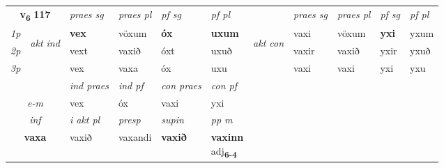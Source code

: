 \noindent
\begin{tabular}{lllllllllll} \toprule
\multicolumn{2}{c}{\textbf{v{\textsubscript{6}}} \Large{\textbf{117}}}  &  \textit{praes sg}  & \textit{praes pl}  &\textit{ pf sg} & \textit{pf pl} &  &  \textit{praes sg}  & \textit{praes pl}  & \textit{pf sg} & \textit{pf pl } \\*
	\cmidrule{3-6} \cmidrule{8-11}
 {\textit{1p}} & \multirow{3}{*}{\begin{turn}{90}\textit{akt ind}\end{turn}} & \textbf{vex} & vöxum & \textbf{óx} & \textbf{uxum} & \multirow{3}{*}{\begin{turn}{90}\textit{akt con}\end{turn}} &vaxi & vöxum & \textbf{yxi} & yxum\\*
 {\textit{2p}} &  &  vext  & vaxið & óxt & uxuð & & vaxir & vaxið & yxir & yxuð \\*
{\textit{3p}} &  & vex & vaxa & óx & uxu & & vaxi & vaxi& yxi & yxu \\*
\cmidrule{3-6} \cmidrule{8-11}

   & &  \textit{ind praes} & \textit{ind pf} & \textit{con praes} & \textit{con pf} \\*
\multicolumn{2}{c}{ \textit{e-m} } & vex & óx & vaxi & yxi \\*

\cmidrule{3-6}
   \multicolumn{2}{c}{\textit{inf}}  & \textit{i akt pl}   & \textit{presp} & \textit{supin}  & \textit{pp m} \\*
  \multicolumn{2}{c}{\textbf{vaxa}}   & vaxið   & vaxandi &  \textbf{vaxið}  & \specialcell{\textbf{vaxinn} \\ adj\textbf{\textsubscript{6-4}}} \\*
\end{tabular}

